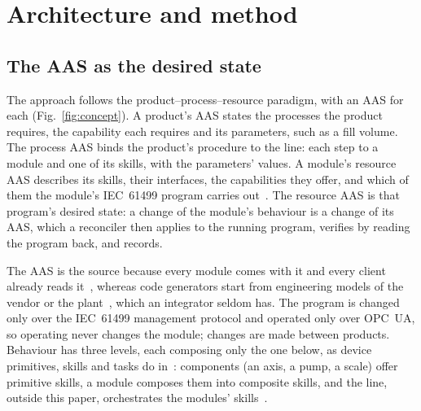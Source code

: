 %
%
%

\section{Architecture and method}
\label{sec:method}

\subsection{The AAS as the desired state}
\label{sec:concept}

The approach follows the product--process--resource paradigm, with an AAS for each
(Fig.~\ref{fig:concept}). A product's AAS states the processes the product requires, the capability
each requires and its parameters, such as a fill volume. The process AAS binds the product's procedure
to the line: each step to a module and one of its skills, with the parameters' values. A module's
resource AAS describes its skills, their interfaces, the capabilities they offer, and which of them
the module's IEC~61499 program carries out~\cite{iec61499}. The resource AAS is that program's desired
state: a change of the module's behaviour is a change of its AAS, which a reconciler then applies to
the running program, verifies by reading the program back, and records.

The AAS is the source because every module comes with it and every client already reads
it~\cite{jensen2026service}, whereas code generators start from engineering models of the vendor or
the plant~\cite{dorofeev2021orchestrator,terzimehic2021service}, which an integrator seldom has. The
program is changed only over the IEC~61499 management protocol and operated only over OPC~UA, so
operating never changes the module; changes are made between products. Behaviour has three levels,
each composing only the one below, as device primitives, skills and tasks do in~\cite{schou2018skill}:
components (an axis, a pump, a scale) offer primitive skills, a module composes them into composite
skills, and the line, outside this paper, orchestrates the modules'
skills~\cite{jensen2026service,schwoerer2026fond}.

